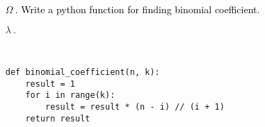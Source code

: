 \documentclass{article}
\begin{document}
\ttfamily
\sloppy
\vspace*{\fill}
\begin{itemize}
	\item[\textcolor{black}{$\Omega ~.$}]\textcolor{black}{Write a python function for finding binomial coefficient.}
	\item[\textcolor{BLUE20}{$\lambda ~.$}]
\begin{verbatim}


def binomial_coefficient(n, k): 
    result = 1
    for i in range(k): 
        result = result * (n - i) // (i + 1) 
    return result 
  
\end{verbatim}
\end{itemize}
\vspace*{\fill}
\end{document}
